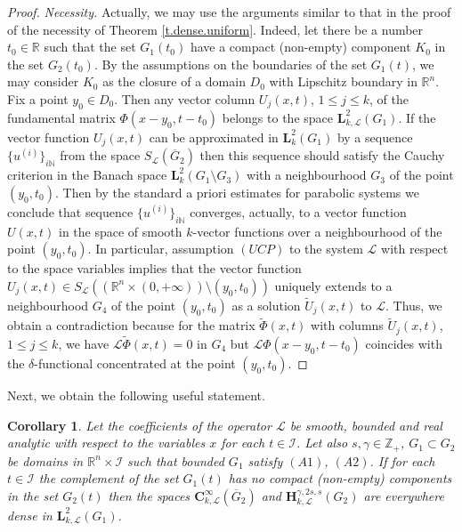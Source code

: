 \documentclass{amsart}
\newtheorem{cor}[thm]{Corollary}
\theoremstyle{definition}
\theoremstyle{remark}
\numberwithin{equation}{section}
\begin{document}
\begin{proof}
\textit{Necessity.} Actually, we may use the arguments similar to 
that in the proof of the necessity of Theorem \ref{t.dense.uniform}. 
Indeed, let there be a number $t_0\in \mathbb R$ such that the set  $G_1 (t_0) $   
have a compact (non-empty) component $K_0$ in the set $G_2 (t_0)$. By the assumptions on the 
boundaries of the set $G_1 (t)$, we may consider $K_0$ as the closure of a domain $D_0$ with 
Lipschitz boundary in ${\mathbb R}^n$. Fix a point $y_0 \in D_0$. Then any vector column 
$U_j (x,t)$, $1\leq j \leq k$, of the fundamental matrix $\Phi (x-y_0, t-t_0)$ belongs to the 
space ${\mathbf L}^2_{k,\mathcal L} (G_1)$. If the vector function $U_j (x,t)$ can be 
approximated in ${\mathbf L}^2_k  (G_1)$ by a sequence $\{ u^{(i)} \}_{i \mathbb N}$ from the 
space $S_{\mathcal L} (\overline G_2)$ then this sequence should satisfy the Cauchy criterion 
in the Banach space ${\mathbf L}^2_k  (G_1 \setminus G_3) $ with a neighbourhood $G_3$ of the 
point $(y_0, t_0)$. Then by the standard a priori estimates for parabolic systems we conclude 
that sequence $\{ u^{(i)} \}_{i \mathbb N}$ converges, actually, to a vector function 
$U(x,t)$ in the space of smooth $k$-vector functions over a neighbourhood of the point 
$(y_0,t_0)$. In particular, assumption $(UCP)$ to the system ${\mathcal L}$ with respect to 
the space variables implies that the vector function $U_j (x,t) \in S_{\mathcal L} 
(({\mathbb R}^n \times (0,+\infty)) \setminus (y_0,t_0))$ uniquely extends to a neighbourhood 
$G_4$ of the point $(y_0,t_0)$ as a solution $\tilde U_j (x,t)$ to ${\mathcal L}$. Thus, we 
obtain a contradiction because for the matrix $\tilde \Phi (x,t)$ with columns $\tilde U_j 
(x,t)$, $1\leq j \leq k$, we have ${\mathcal L} \tilde \Phi (x,t) =0$ in $G_4$ but
${\mathcal L} \Phi  (x-y_0,t-t_0)$ coincides with the $\delta$-functional concentrated at 
the point $(y_0,t_0)$. 
\end{proof}

Next, we obtain the following useful statement.

\begin{cor} \label{c.dense.base0} 
Let the coefficients of the operator $\mathcal L$ be smooth, bounded and real analytic with 
respect to the variables $x$ for each $t\in \mathcal{I}$. Let also $s,\gamma\in 
{\mathbb Z}_+$,  $G_1 \subset G_2 $ be domains in ${\mathbb R}^{n}\times \mathcal{I}$ such that 
bounded $G_1$ satisfy $(A1)$, $(A2)$. If  for each $t \in \mathcal{I}$ the complement 
of the set  $G_1 (t) $ has no compact (non-empty) components in the set $G_2 (t)$ then the 
spaces ${\mathbf C}^\infty_{k,\mathcal L}(\overline G_2)$ and ${\mathbf H}^{\gamma,2s,s} 
_{k,\mathcal L}(G_2)$ are everywhere dense in  ${\mathbf L}^{2} _{k,\mathcal L}(G_1)$. 
\end{cor}
\end{document}
